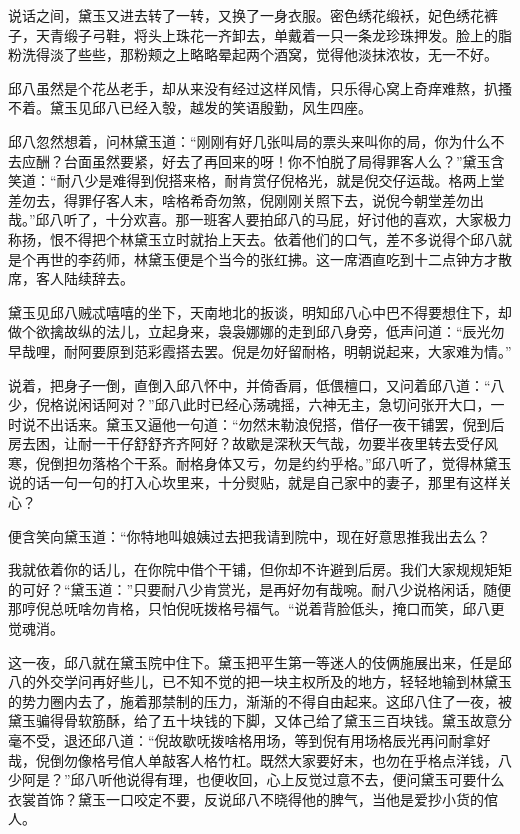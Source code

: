 \documentclass[12pt,UTF8]{ctexbook}
\begin{document}
{{{说话之间，黛玉又进去转了一转，又换了一身衣服。密色绣花缎袄，妃色绣花裤子，天青缎子弓鞋，将头上珠花一齐卸去，单戴着一只一条龙珍珠押发。脸上的脂粉洗得淡了些些，那粉颊之上略略晕起两个酒窝，觉得他淡抹浓妆，无一不好。

邱八虽然是个花丛老手，却从来没有经过这样风情，只乐得心窝上奇痒难熬，扒搔不着。黛玉见邱八已经入彀，越发的笑语殷勤，风生四座。

邱八忽然想着，问林黛玉道：“刚刚有好几张叫局的票头来叫你的局，你为什么不去应酬？台面虽然要紧，好去了再回来的呀！你不怕脱了局得罪客人么？”黛玉含笑道：“耐八少是难得到倪搭来格，耐肯赏仔倪格光，就是倪交仔运哉。格两上堂差勿去，得罪仔客人末，啥格希奇勿煞，倪刚刚关照下去，说倪今朝堂差勿出哉。”邱八听了，十分欢喜。那一班客人要拍邱八的马屁，好讨他的喜欢，大家极力称扬，恨不得把个林黛玉立时就抬上天去。依着他们的口气，差不多说得个邱八就是个再世的李药师，林黛玉便是个当今的张红拂。这一席酒直吃到十二点钟方才散席，客人陆续辞去。

黛玉见邱八贼忒嘻嘻的坐下，天南地北的扳谈，明知邱八心中巴不得要想住下，却做个欲擒故纵的法儿，立起身来，袅袅娜娜的走到邱八身旁，低声问道：“辰光勿早哉哩，耐阿要原到范彩霞搭去罢。倪是勿好留耐格，明朝说起来，大家难为情。”

说着，把身子一倒，直倒入邱八怀中，并倚香肩，低偎檀口，又问着邱八道：“八少，倪格说闲话阿对？”邱八此时已经心荡魂摇，六神无主，急切问张开大口，一时说不出话来。黛玉又逼他一句道：“勿然末勒浪倪搭，借仔一夜干铺罢，倪到后房去困，让耐一干仔舒舒齐齐阿好？故歇是深秋天气哉，勿要半夜里转去受仔风寒，倪倒担勿落格个干系。耐格身体又亏，勿是约约乎格。”邱八听了，觉得林黛玉说的话一句一句的打入心坎里来，十分熨贴，就是自己家中的妻子，那里有这样关心？

便含笑向黛玉道：“你特地叫娘姨过去把我请到院中，现在好意思推我出去么？

我就依着你的话儿，在你院中借个干铺，但你却不许避到后房。我们大家规规矩矩的可好？“黛玉道：”只要耐八少肯赏光，是再好勿有哉啘。耐八少说格闲话，随便那哼倪总呒啥勿肯格，只怕倪呒拨格号福气。“说着背脸低头，掩口而笑，邱八更觉魂消。

这一夜，邱八就在黛玉院中住下。黛玉把平生第一等迷人的伎俩施展出来，任是邱八的外交学问再好些儿，已不知不觉的把一块主权所及的地方，轻轻地输到林黛玉的势力圈内去了，施着那禁制的压力，渐渐的不得自由起来。这邱八住了一夜，被黛玉骗得骨软筋酥，给了五十块钱的下脚，又体己给了黛玉三百块钱。黛玉故意分毫不受，退还邱八道：“倪故歇呒拨啥格用场，等到倪有用场格辰光再问耐拿好哉，倪倒勿像格号倌人单敲客人格竹杠。既然大家要好末，也勿在乎格点洋钱，八少阿是？”邱八听他说得有理，也便收回，心上反觉过意不去，便问黛玉可要什么衣裳首饰？黛玉一口咬定不要，反说邱八不晓得他的脾气，当他是爱抄小货的倌人。

}}}
\end{document}
